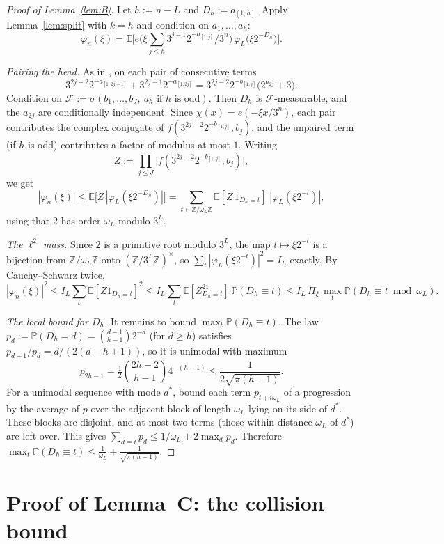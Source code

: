 \documentclass[11pt]{amsart}
\theoremstyle{remark}
\newcommand{\E}{\mathbb{E}}
\renewcommand{\P}{\mathbb{P}}
\newcommand{\Z}{\mathbb{Z}}
\newcommand{\T}[1]{\cite[#1]{Tao22}}   %
\theoremstyle{plain}
\begin{document}
\begin{proof}[Proof of Lemma~\ref{lem:B}]
Let $h:=n-L$ and $D_h:=a_{[1,h]}$. Apply Lemma~\ref{lem:split} with $k=h$ and condition on $a_1,\dots,a_h$:
\[
\varphi_n(\xi)=\E\Big[e\Big(\xi\textstyle\sum_{j\le h}3^{j-1}2^{-a_{[1,j]}}/3^n\Big)\,\varphi_L\big(\xi2^{-D_h}\big)\Big].
\]

\emph{Pairing the head.} As in \T{\S7.1}, on each pair of consecutive terms
\[
3^{2j-2}2^{-a_{[1,2j-1]}}+3^{2j-1}2^{-a_{[1,2j]}}=3^{2j-2}2^{-b_{[1,j]}}\big(2^{a_{2j}}+3\big).
\]
Condition on $\mathcal F:=\sigma(b_1,\dots,b_J,\ a_h\text{ if }h\text{ is odd})$. Then $D_h$ is $\mathcal F$-measurable, and the $a_{2j}$ are conditionally independent. Since $\chi(x)=e(-\xi x/3^n)$, each pair contributes the complex conjugate of $f(3^{2j-2}2^{-b_{[1,j]}},b_j)$, and the unpaired term (if $h$ is odd) contributes a factor of modulus at most $1$. Writing
\[
Z:=\prod_{j\le J}\big|f(3^{2j-2}2^{-b_{[1,j]}},b_j)\big|,
\]
we get
\[
|\varphi_n(\xi)|\le\E\big[Z\,|\varphi_L(\xi2^{-D_h})|\big]=\sum_{t\in\Z/\omega_L\Z}\E[Z\,1_{D_h\equiv t}]\;|\varphi_L(\xi2^{-t})|,
\]
using that $2$ has order $\omega_L$ modulo $3^L$.

\emph{The $\ell^2$ mass.} Since $2$ is a primitive root modulo $3^L$, the map $t\mapsto\xi2^{-t}$ is a bijection from $\Z/\omega_L\Z$ onto $(\Z/3^L\Z)^\times$, so $\sum_t|\varphi_L(\xi2^{-t})|^2=I_L$ exactly. By Cauchy--Schwarz twice,
\[
|\varphi_n(\xi)|^2\le I_L\sum_t\E[Z1_{D_h\equiv t}]^2\le I_L\sum_t\E[Z^21_{D_h\equiv t}]\,\P(D_h\equiv t)\le I_L\,\Pi_\xi\,\max_t\P(D_h\equiv t\bmod\omega_L).
\]

\emph{The local bound for $D_h$.} It remains to bound $\max_t\P(D_h\equiv t)$. The law $p_d:=\P(D_h=d)=\binom{d-1}{h-1}2^{-d}$ (for $d\ge h$) satisfies $p_{d+1}/p_d=d/(2(d-h+1))$, so it is unimodal with maximum
\[
p_{2h-1}=\tfrac12\binom{2h-2}{h-1}4^{-(h-1)}\le\frac{1}{2\sqrt{\pi(h-1)}} .
\]
For a unimodal sequence with mode $d^*$, bound each term $p_{t+i\omega_L}$ of a progression by the average of $p$ over the adjacent block of length $\omega_L$ lying on its side of $d^*$. These blocks are disjoint, and at most two terms (those within distance $\omega_L$ of $d^*$) are left over. This gives $\sum_{d\equiv t}p_d\le1/\omega_L+2\max_dp_d$. Therefore $\max_t\P(D_h\equiv t)\le\frac1{\omega_L}+\frac1{\sqrt{\pi(h-1)}}$.
\end{proof}

\section{Proof of Lemma~C: the collision bound}\label{sec:C}
\end{document}
